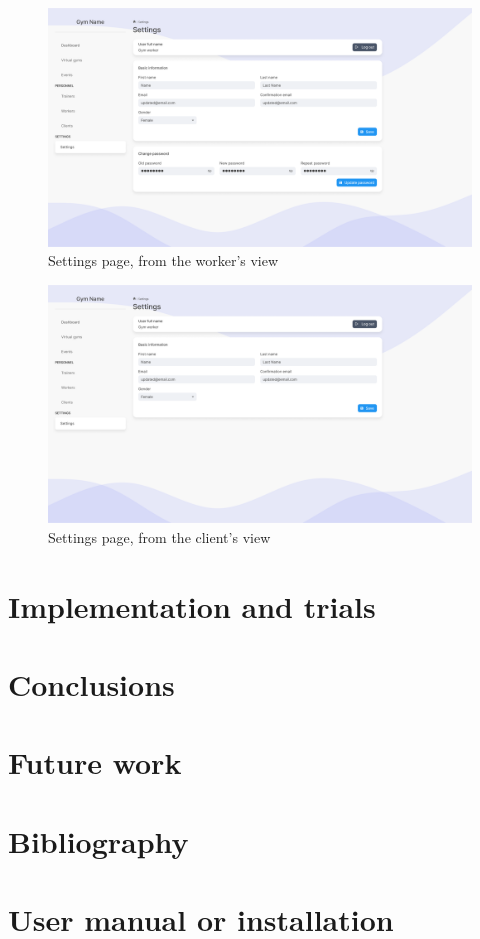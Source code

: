 \documentclass[a4paper, 12pt, oneside]{book}
\begin{document}
\begin{figure}[H]
	\centering
	\includegraphics[width=\textwidth]{assets/ui/Worker.png}
	\caption{Settings page, from the worker's view}
\end{figure}
\begin{figure}[H]
	\centering
	\includegraphics[width=\textwidth]{assets/ui/Client.png}
	\caption{Settings page, from the client's view}
\end{figure}
\chapter{Implementation and trials}
\chapter{Conclusions}
\chapter{Future work}
\appendix
\chapter{Bibliography}
\chapter{User manual or installation}
\end{document}
